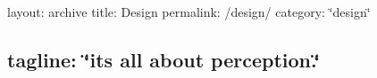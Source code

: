 

 layout\+: archive title\+: Design permalink\+: /design/ category\+: \char`\"{}design\char`\"{} \subsection*{tagline\+: \char`\"{}it\textquotesingle{}s all about perception.\char`\"{} }